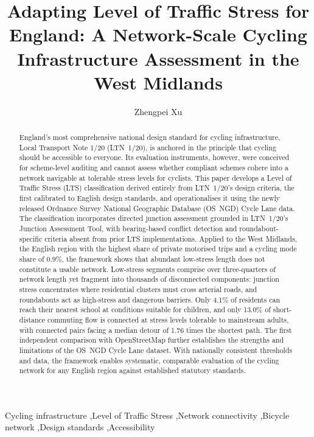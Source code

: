\documentclass[final,5p,times,twocolumn,authoryear]{elsarticle}
\begin{document}
\clearpage
\twocolumn

\begin{frontmatter}

\title{Adapting Level of Traffic Stress for England: A Network-Scale Cycling
Infrastructure Assessment in the West Midlands}

\author[CASA]{Zhengpei Xu}


\begin{abstract}
England's most comprehensive national design standard for cycling infrastructure, Local Transport Note 1/20 (LTN~1/20), is anchored in the principle that cycling should be accessible to everyone. Its evaluation instruments, however, were conceived for scheme-level auditing and cannot assess whether compliant schemes cohere into a network navigable at tolerable stress levels for cyclists. This paper develops a Level of Traffic Stress (LTS) classification derived entirely from LTN~1/20's design criteria, the first calibrated to English design standards, and operationalises it using the newly released Ordnance Survey National Geographic Database (OS~NGD) Cycle Lane data. The classification incorporates directed junction assessment grounded in LTN~1/20's Junction Assessment Tool, with bearing-based conflict detection and roundabout-specific criteria absent from prior LTS implementations. Applied to the West Midlands, the English region with the highest share of private motorised trips and a cycling mode share of 0.9\%, the framework shows that abundant low-stress length does not constitute a usable network. Low-stress segments comprise over three-quarters of network length yet fragment into thousands of disconnected components: junction stress concentrates where residential clusters must cross arterial roads, and roundabouts act as high-stress and dangerous barriers. Only 4.1\% of residents can reach their nearest school at conditions suitable for children, and only 13.0\% of short-distance commuting flow is connected at stress levels tolerable to mainstream adults, with connected pairs facing a median detour of 1.76 times the shortest path. The first independent comparison with OpenStreetMap further establishes the strengths and limitations of the OS~NGD Cycle Lane dataset. With nationally consistent thresholds and data, the framework enables systematic, comparable evaluation of the cycling network for any English region against established statutory standards.
\end{abstract}

\begin{keyword}
Cycling infrastructure \sep Level of Traffic Stress \sep Network connectivity \sep Bicycle network \sep Design standards \sep Accessibility
\end{keyword}

\end{frontmatter}
\end{document}
